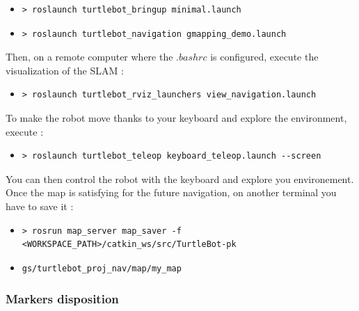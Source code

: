 \documentclass[10pt,a4paper]{article}
\begin{document}
\begin{itemize}
\item[]  \begin{verbatim}> roslaunch turtlebot_bringup minimal.launch \end{verbatim}
\item[]  \begin{verbatim}> roslaunch turtlebot_navigation gmapping_demo.launch \end{verbatim}
\end{itemize}

Then, on a remote computer where the $.bashrc$ is configured, execute the visualization of the SLAM :

\begin{itemize}
\item[]  \begin{verbatim}> roslaunch turtlebot_rviz_launchers view_navigation.launch \end{verbatim}
\end{itemize}

To make the robot move thanks to your keyboard and explore the environment, execute :

\begin{itemize}
\item[]  \begin{verbatim}> roslaunch turtlebot_teleop keyboard_teleop.launch --screen \end{verbatim}
\end{itemize}

You can then control the robot with the keyboard and explore you environement. Once the map is satisfying for the future navigation, on another terminal you have to save it :

\begin{itemize}
\item[]  \begin{verbatim}> rosrun map_server map_saver -f <WORKSPACE_PATH>/catkin_ws/src/TurtleBot-pk\end{verbatim}
\item[]  \begin{verbatim}gs/turtlebot_proj_nav/map/my_map\end{verbatim}
\end{itemize}

\subsubsection{Markers disposition}
 
\end{document}
